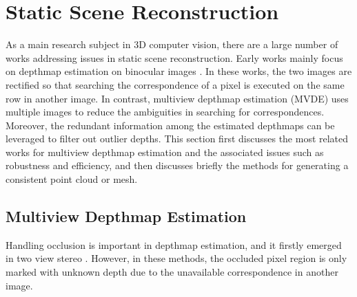 \section{Static Scene Reconstruction}
As a main research subject in 3D computer vision, there are a large number of works addressing issues in static scene reconstruction. Early works mainly focus on depthmap estimation on binocular images \cite{boykov2001fast,Sun_ECCV2002_stereoBeliefProp,scharstein2002taxonomy,scharstein2007learning}. 
In these works, the two images are rectified so that searching the correspondence of a pixel is executed on the same row in another image. In contrast, multiview depthmap estimation (MVDE) uses multiple images to reduce the ambiguities in searching for correspondences. Moreover, the redundant information among the estimated depthmaps can be leveraged to filter out outlier depths. 
This section first discusses the most related works for multiview depthmap estimation and the associated issues such as  robustness and efficiency, and then discusses briefly the methods for generating a consistent point cloud or mesh.

\subsection{Multiview Depthmap Estimation}
Handling occlusion is important in depthmap estimation, and it firstly emerged in two view stereo \cite{Sun_ECCV2002_stereoBeliefProp, Sun_CVPR2005_stereo, Xiao:2008}. However, in these methods, the occluded pixel region is only marked with unknown depth due to the unavailable correspondence in another image. 


